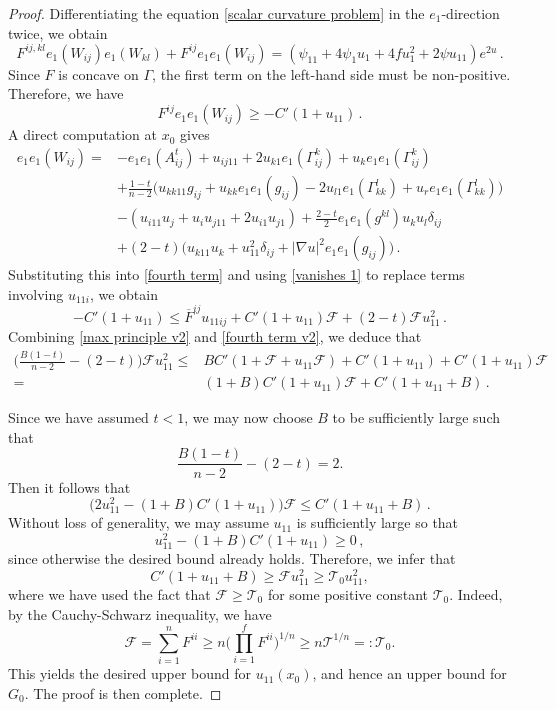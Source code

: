 \documentclass{article}
\theoremstyle{plain}
\theoremstyle{definition}
\theoremstyle{definition}
\numberwithin{equation}{section}
\begin{document}
\begin{sloppypar}
\begin{proof}
Differentiating the equation \eqref{scalar curvature problem} in the $e_1$-direction twice, we obtain
\begin{equation*}
F^{ij,kl}e_{1}(W_{ij})e_{1}(W_{kl})+F^{ij}e_{1}e_{1}(W_{ij})=(\psi_{11}+4\psi_{1}u_{1}+4fu_{1}^2+2\psi u_{11})e^{2u}\,.
\end{equation*}
Since $F$ is concave on $\Gamma$, the first term on the left-hand side must be non-positive. Therefore, we have
\begin{equation}\label{fourth term}
F^{ij}e_{1}e_{1}(W_{ij})\geq -C'(1+u_{11})\,.
\end{equation}
A direct computation at $x_0$ gives
\[
\begin{split}
e_{1}e_{1}(W_{ij})=&-e_{1}e_{1}(A^{t}_{ij})+u_{ij11}+2u_{k1}e_{1}(\Gamma_{ij}^{k})+u_{k}e_{1}e_{1}(\Gamma_{ij}^{k})  \\
&+\frac{1-t}{n-2}\big(u_{kk11}g_{ij}+u_{kk}e_{1}e_{1}(g_{ij})-2u_{l1}e_{1}(\Gamma_{kk}^{l})+u_{r}e_{1}e_{1}(\Gamma_{kk}^{l}) \big)\\
&-(u_{i11}u_{j}+u_{i}u_{j11}+2u_{i1}u_{j1})+\frac{2-t}{2}e_{1}e_{1}(g^{kl})u_{k}u_{l}\delta_{ij}\\
&+(2-t)\big(u_{k11}u_{k}+u_{11}^{2}\delta_{ij}+|\nabla u|^2e_{1}e_{1}(g_{ij}) \big)\,.
\end{split}
\]
Substituting this into \eqref{fourth term} and using \eqref{vanishes 1} to replace terms involving $u_{11i}$, we obtain
\begin{equation}\label{fourth term v2}
-C'(1+u_{11})\leq \overline{F}^{ij} u_{11ij}+C'(1+u_{11})\mathcal{F}+(2-t)\mathcal{F}u_{11}^{2}\,.
\end{equation}
Combining \eqref{max principle v2} and \eqref{fourth term v2}, we deduce that
\begin{equation*}
\begin{split}
 \Big(\frac{B(1-t)}{n-2}-(2-t)\Big)\mathcal{F} u_{11}^{2}\leq &BC' (1+\mathcal{F}+u_{11}\mathcal{F} )+C'(1+u_{11})+C'(1+u_{11})\mathcal{F}\\
 =& (1+B)C'(1+u_{11})\mathcal{F}+C'(1+u_{11}+B)\,.
\end{split}
\end{equation*}

Since we have assumed $t<1$,  we may now choose $B$ to be sufficiently large such that
\[
\frac{B(1-t)}{n-2}-(2-t)=2.
\]
Then it follows that
\[
\big(2u_{11}^{2}- (1+B)C'(1+u_{11}) \big)\mathcal{F}\leq C'(1+u_{11}+B)\,.
\]
Without loss of generality, we may assume $u_{11}$ is sufficiently large so that 
\[
u_{11}^{2}- (1+B)C'(1+u_{11})\geq 0\,,
\]
since otherwise the desired bound already holds. Therefore, we infer that
\[
C'(1+u_{11}+B)\geq \mathcal{F}u_{11}^{2}\geq \mathscr{T}_{0}u_{11}^{2},
\]
where we have used the fact that $\mathcal{F} \geq \mathscr{T}_{0}$ for some positive constant $\mathscr{T}_{0}$. Indeed, by the Cauchy-Schwarz inequality, we have
\[
\mathcal{F}=\sum_{i=1}^{n}F^{ii}\geq n\Big(\prod_{i=1}^{f}F^{ii} \Big)^{1/n}\geq n\mathscr{T}^{1/n}=:\mathscr{T}_{0}.
\]
This yields the desired upper bound for $u_{11}(x_0)$, and hence an upper bound for $G_0$. The proof is then complete.
\end{proof}


\end{sloppypar}
\end{document}
